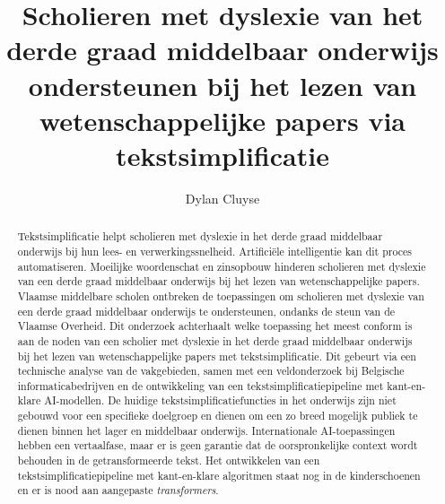 \documentclass{hogent-article}
\title{Scholieren met dyslexie van het derde graad middelbaar onderwijs ondersteunen bij het lezen van wetenschappelijke papers via tekstsimplificatie}
\author{Dylan Cluyse}
\begin{document}
\begin{abstract}
Tekstsimplificatie helpt scholieren met dyslexie in het derde graad middelbaar onderwijs bij hun lees- en verwerkingssnelheid. Artificiële intelligentie kan dit proces automatiseren. Moeilijke woordenschat en zinsopbouw hinderen scholieren met dyslexie van een derde graad middelbaar onderwijs bij het lezen van wetenschappelijke papers. Vlaamse middelbare scholen ontbreken de toepassingen om scholieren met dyslexie van een derde graad middelbaar onderwijs te ondersteunen, ondanks de steun van de Vlaamse Overheid. Dit onderzoek achterhaalt welke toepassing het meest conform is aan de noden van een scholier met dyslexie in het derde graad middelbaar onderwijs bij het lezen van wetenschappelijke papers met tekstsimplificatie.  Dit gebeurt via een technische analyse van de vakgebieden, samen met een veldonderzoek bij Belgische informaticabedrijven en de ontwikkeling van een tekstsimplificatiepipeline met kant-en-klare AI-modellen. De huidige tekstsimplificatiefuncties in het onderwijs zijn niet gebouwd voor een specifieke doelgroep en dienen om een zo breed mogelijk publiek te dienen binnen het lager en middelbaar onderwijs. Internationale AI-toepassingen hebben een vertaalfase, maar er is geen garantie dat de oorspronkelijke context wordt behouden in de getransformeerde tekst. Het ontwikkelen van een tekstsimplificatiepipeline met kant-en-klare algoritmen staat nog in de kinderschoenen en er is nood aan aangepaste \textit{transformers}.
\end{abstract}

\tableofcontents



\printbibliography[heading=bibintoc]
\end{document}

